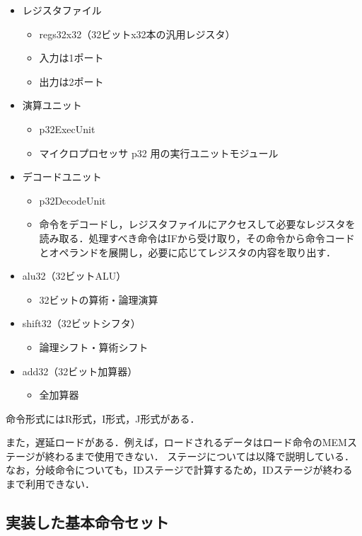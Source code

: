\documentclass{jarticle}[11pt]
\begin{document}
\begin{itemize}
  \item レジスタファイル
    \begin{itemize}
      \item regs32x32（32ビットx32本の汎用レジスタ）
      \item 入力は1ポート
      \item 出力は2ポート
    \end{itemize}
  \item 演算ユニット
    \begin{itemize}
      \item p32ExecUnit
      \item マイクロプロセッサ p32 用の実行ユニットモジュール
    \end{itemize}
  \item デコードユニット
    \begin{itemize}
      \item p32DecodeUnit
      \item 命令をデコードし，レジスタファイルにアクセスして必要なレジスタを読み取る．処理すべき命令はIFから受け取り，その命令から命令コードとオペランドを展開し，必要に応じてレジスタの内容を取り出す．
    \end{itemize}
  \item alu32（32ビットALU）
    \begin{itemize}
      \item 32ビットの算術・論理演算
    \end{itemize}
  \item shift32（32ビットシフタ）
    \begin{itemize}
      \item 論理シフト・算術シフト
    \end{itemize}
  \item add32（32ビット加算器）
    \begin{itemize}
      \item 全加算器
    \end{itemize}
\end{itemize}


命令形式にはR形式，I形式，J形式がある．

また，遅延ロードがある．例えば，ロードされるデータはロード命令のMEMステージが終わるまで使用できない．
ステージについては以降で説明している．なお，分岐命令についても，IDステージで計算するため，IDステージが終わるまで利用できない．

\subsection{実装した基本命令セット}
\end{document}
